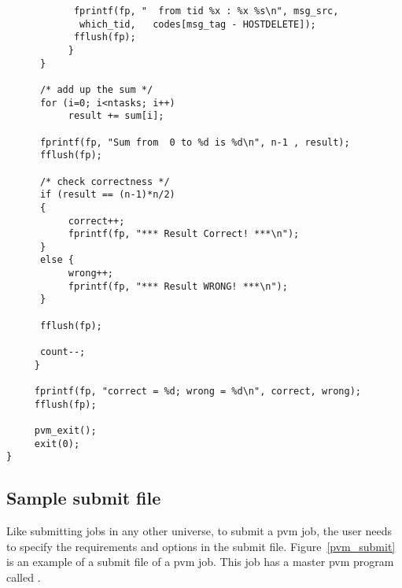 \begin{small}
\begin{verbatim}
		    fprintf(fp, "  from tid %x : %x %s\n", msg_src,
			 which_tid,   codes[msg_tag - HOSTDELETE]);
		    fflush(fp);
	       }
	  }	       
	  
	  /* add up the sum */
	  for (i=0; i<ntasks; i++)
	       result += sum[i];
	  
	  fprintf(fp, "Sum from  0 to %d is %d\n", n-1 , result);
	  fflush(fp);
	  
	  /* check correctness */
	  if (result == (n-1)*n/2)
	  {
	       correct++;
	       fprintf(fp, "*** Result Correct! ***\n");
	  }
	  else {
	       wrong++;
	       fprintf(fp, "*** Result WRONG! ***\n");
	  }

	  fflush(fp);
	  
	  count--;
     }
     
     fprintf(fp, "correct = %d; wrong = %d\n", correct, wrong);
     fflush(fp);

     pvm_exit();
     exit(0);
}

\end{verbatim}
\end{small}

\subsection{Sample submit file}
\label{submit}

Like submitting jobs in any other universe,
to submit a pvm job, the user needs to specify the requirements and
options in the submit file.  Figure~\ref{pvm_submit} is an example of
a submit file of a pvm job.  This job has a master pvm program called
.



